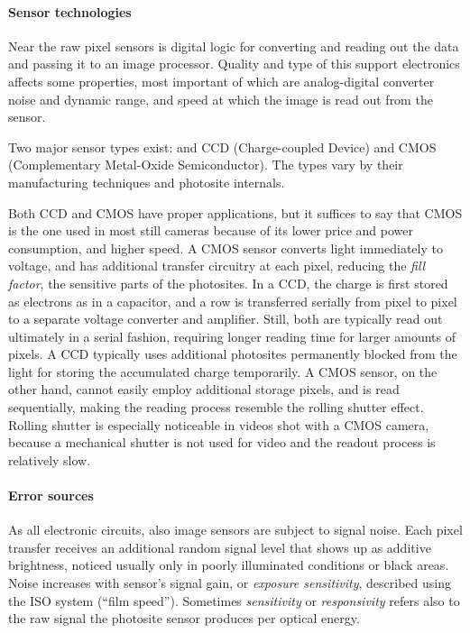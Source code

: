 \paragraph{Sensor technologies}
Near the raw pixel sensors is digital logic for converting and reading out the data and passing it to an image processor.
Quality and type of this support electronics affects some properties, most important of which are analog-digital converter noise and dynamic range, and speed at which the image is read out from the sensor.

Two major sensor types exist: and CCD (Charge-coupled Device) and CMOS (Complementary Metal-Oxide Semiconductor).
The types vary by their manufacturing techniques and photosite internals. \cite{taylor1998ccd,el2005cmos}

Both CCD and CMOS have proper applications, but it suffices to say that CMOS is the one used in most still cameras because of its lower price and power consumption, and higher speed.
A CMOS sensor converts light immediately to voltage, and has additional transfer circuitry at each pixel, reducing the \emph{fill factor}, the sensitive parts of the photosites.
In a CCD, the charge is first stored as electrons as in a capacitor, and a row is transferred serially from pixel to pixel to a separate voltage converter and amplifier.
Still, both are typically read out ultimately in a serial fashion, requiring longer reading time for larger amounts of pixels.
A CCD typically uses additional photosites permanently blocked from the light for storing the accumulated charge temporarily.
A CMOS sensor, on the other hand, cannot easily employ additional storage pixels, and is read sequentially, making the reading process resemble the rolling shutter effect.
Rolling shutter is especially noticeable in videos shot with a CMOS camera, because a mechanical shutter is not used for video and the readout process is relatively slow.
\cite{taylor1998ccd,caspeelectronic,litwiller2001ccd}

\paragraph{Error sources}
As all electronic circuits, also image sensors are subject to signal noise.
Each pixel transfer receives an additional random signal level that shows up as additive brightness, noticed usually only in poorly illuminated conditions or black areas.
Noise increases with sensor's signal gain, or \emph{exposure sensitivity}, described using the ISO system (``film speed'').
Sometimes \emph{sensitivity} or \emph{responsivity} refers also to the raw signal the photosite sensor produces per optical energy. \cite{litwiller2001ccd}

